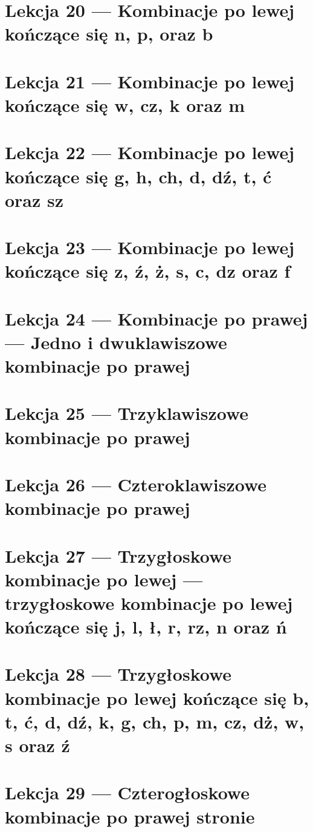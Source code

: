 \documentclass[12p, oneside]{book}
\begin{document}
\section{Lekcja 20 --- Kombinacje po lewej kończące się n, p, oraz b}
\newpage
\section{Lekcja 21 --- Kombinacje po lewej kończące się w, cz, k oraz m}
\newpage
\section{Lekcja 22 --- Kombinacje po lewej kończące się g, h, ch, d, dź, t, ć oraz sz}
\newpage
\section{Lekcja 23 --- Kombinacje po lewej kończące się z, ź, ż, s, c, dz oraz f}
\newpage
\section{Lekcja 24 --- Kombinacje po prawej --- Jedno i dwuklawiszowe kombinacje po prawej}
\newpage
\section{Lekcja 25 --- Trzyklawiszowe kombinacje po prawej}
\newpage
\section{Lekcja 26 --- Czteroklawiszowe kombinacje po prawej}
\newpage
\section{Lekcja 27 --- Trzygłoskowe kombinacje po lewej --- trzygłoskowe kombinacje po lewej kończące się j, l, ł, r, rz, n oraz ń}
\newpage
\section{Lekcja 28 --- Trzygłoskowe kombinacje po lewej kończące się b, t, ć, d, dź, k, g, ch, p, m, cz, dż, w, s oraz ź}

\newpage
\section{Lekcja 29 --- Czterogłoskowe kombinacje po prawej stronie}
\end{document}
